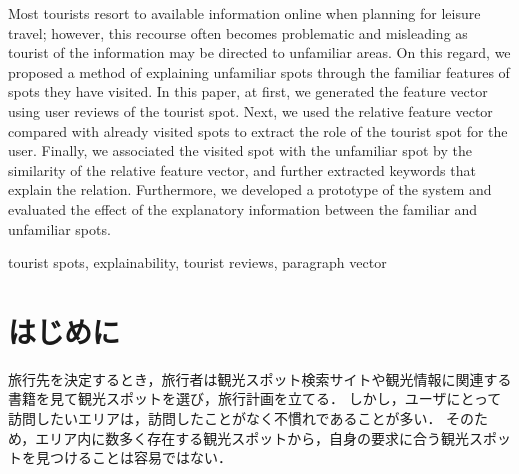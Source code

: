 \documentclass[submit]{ipsj}
\begin{document}
\begin{eabstract}
Most tourists resort to available information online when planning for leisure travel; however, this recourse often becomes problematic and misleading as tourist of the information may be directed to unfamiliar areas.
On this regard, we proposed a method of explaining unfamiliar spots through the familiar features of spots they have visited.
In this paper, at first, we generated the feature vector using user reviews of the tourist spot.
Next, we used the relative feature vector compared with already visited spots to extract the role of the tourist spot for the user.
Finally, we associated the visited spot with the unfamiliar spot by the similarity of the relative feature vector, and further extracted keywords that explain the relation.
Furthermore, we developed a prototype of the system and evaluated the effect of the explanatory information between the familiar and unfamiliar spots.
\end{eabstract}

\begin{ekeyword}
tourist spots, explainability, tourist reviews, paragraph vector
\end{ekeyword}

\maketitle

\section{はじめに}

旅行先を決定するとき，旅行者は観光スポット検索サイトや観光情報に関連する書籍を見て観光スポットを選び，旅行計画を立てる．
しかし，ユーザにとって訪問したいエリアは，訪問したことがなく不慣れであることが多い．
そのため，エリア内に数多く存在する観光スポットから，自身の要求に合う観光スポットを見つけることは容易ではない．
\end{document}
